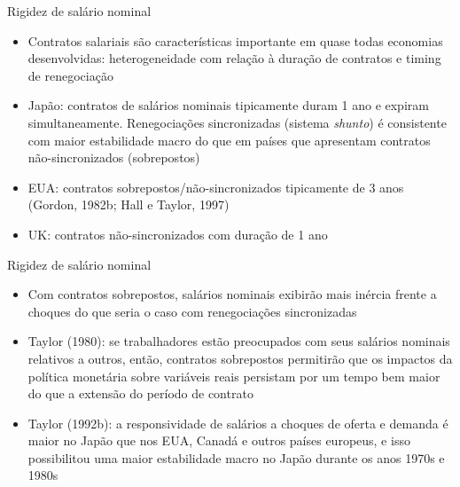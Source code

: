 \documentclass[10pt]{beamer}
\begin{document}
\begin{frame}{Rigidez de salário nominal}
    \begin{itemize}
        \item Contratos salariais são características importante em quase todas economias desenvolvidas: heterogeneidade com relação à duração de contratos e timing de renegociação\bigskip
        \item Japão: contratos de salários nominais tipicamente duram 1 ano e expiram simultaneamente. Renegociações sincronizadas (sistema \emph{shunto}) é consistente com maior estabilidade macro do que em países que apresentam contratos não-sincronizados (sobrepostos)\bigskip
        \item EUA: contratos sobrepostos/não-sincronizados tipicamente de 3 anos (Gordon, 1982b; Hall e Taylor, 1997)\bigskip
        \item UK: contratos não-sincronizados com duração de 1 ano
    \end{itemize}
\end{frame}

\begin{frame}{Rigidez de salário nominal}
    \begin{itemize}
        \item Com contratos sobrepostos, salários nominais exibirão mais inércia frente a choques do que seria o caso com renegociações sincronizadas\bigskip
        \item Taylor (1980): se trabalhadores estão preocupados com seus salários nominais relativos a outros, então, contratos sobrepostos permitirão que os impactos da política monetária sobre variáveis reais persistam por um tempo bem maior do que a extensão do período de contrato\bigskip
        \item Taylor (1992b): a responsividade de salários a choques de oferta e demanda é maior no Japão que nos EUA, Canadá e outros países europeus, e isso possibilitou uma maior estabilidade macro no Japão durante os anos 1970s e 1980s
    \end{itemize}
\end{frame}
\end{document}
